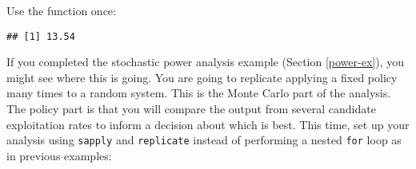 \documentclass[]{book}
\newenvironment{Shaded}{\begin{snugshade}}{\end{snugshade}}
\newcommand{\KeywordTok}[1]{\textcolor[rgb]{0.13,0.29,0.53}{\textbf{#1}}}
\newcommand{\DataTypeTok}[1]{\textcolor[rgb]{0.13,0.29,0.53}{#1}}
\newcommand{\DecValTok}[1]{\textcolor[rgb]{0.00,0.00,0.81}{#1}}
\newcommand{\FloatTok}[1]{\textcolor[rgb]{0.00,0.00,0.81}{#1}}
\newcommand{\StringTok}[1]{\textcolor[rgb]{0.31,0.60,0.02}{#1}}
\newcommand{\CommentTok}[1]{\textcolor[rgb]{0.56,0.35,0.01}{\textit{#1}}}
\newcommand{\ControlFlowTok}[1]{\textcolor[rgb]{0.13,0.29,0.53}{\textbf{#1}}}
\newcommand{\OperatorTok}[1]{\textcolor[rgb]{0.81,0.36,0.00}{\textbf{#1}}}
\newcommand{\NormalTok}[1]{#1}
\theoremstyle{definition}
\theoremstyle{definition}
\theoremstyle{definition}
\theoremstyle{remark}
\begin{document}
Use the function once:

\begin{Shaded}
\end{Shaded}

\begin{verbatim}
## [1] 13.54
\end{verbatim}

If you completed the stochastic power analysis example (Section
\ref{power-ex}), you might see where this is going. You are going to
replicate applying a fixed policy many times to a random system. This is
the Monte Carlo part of the analysis. The policy part is that you will
compare the output from several candidate exploitation rates to inform a
decision about which is best. This time, set up your analysis using
\texttt{sapply} and \texttt{replicate} instead of performing a nested
\texttt{for} loop as in previous examples:

\begin{Shaded}
\end{Shaded}
\end{document}
